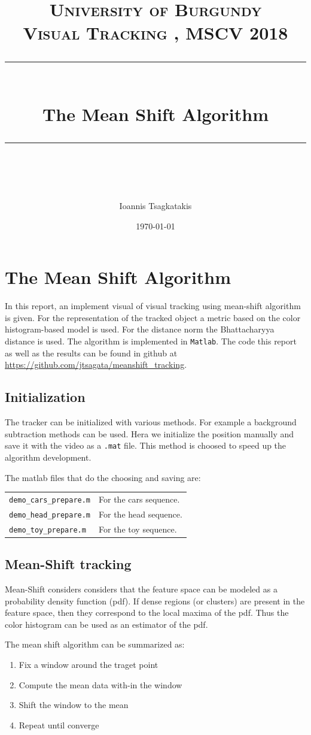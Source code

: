 \documentclass[a4paper,12pt]{article}
\title{
\normalfont \normalsize 
\textsc{University of Burgundy \\ 
Visual Tracking
, MSCV 2018} \\
[10pt] 
\rule{\linewidth}{0.5pt} \\[6pt] 
\huge The Mean Shift Algorithm \\
\rule{\linewidth}{2pt}  \\[10pt]
}
\author{Ioannis Tsagkatakis}
\date{\normalsize \today}
\begin{document}
\maketitle
\noindent



\section{The Mean Shift Algorithm}
 In this report, an implement visual of visual tracking using mean-shift
algorithm is given. For the representation of the tracked object a metric based on the color histogram-based model is used. For the distance norm the Bhattacharyya distance is used. The algorithm is implemented in \texttt{Matlab}. The code this report as well as the results can be found in  github at \url{https://github.com/jtsagata/meanshift_tracking}.


\subsection{Initialization}
The tracker can be initialized with various methods. For example a background subtraction methods can be used. Hera we initialize the position manually and save it with the video as a \texttt{.mat} file. This method is choosed to speed up the algorithm development.

The matlab files that do the choosing and saving are:

\begin{tabular}[h]{l l}
	\texttt{demo\_cars\_prepare.m} & For the cars sequence. \\
	\texttt{demo\_head\_prepare.m} & For the head sequence. \\
	\texttt{demo\_toy\_prepare.m} & For the toy sequence. \\
\end{tabular}


\subsection{Mean-Shift tracking}
Mean-Shift considers considers that the feature space can be modeled as a probability density function (pdf). If dense regions (or clusters) are present in the feature space, then they correspond to the local maxima of the pdf. Thus the color histogram can be used as an estimator of the pdf.

The mean shift algorithm can be summarized as:
\begin{enumerate}
\item Fix a window around the traget point
\item Compute the mean data with-in the window
\item Shift the window to the mean
\item Repeat until converge
\end{enumerate}
\end{document}
